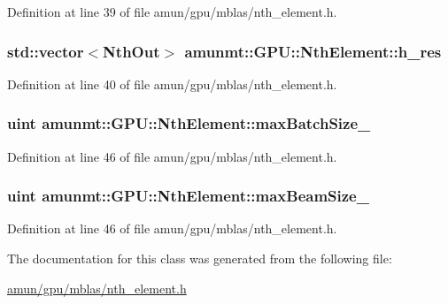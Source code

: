 Definition at line 39 of file amun/gpu/mblas/nth\+\_\+element.\+h.

\subsubsection[{\texorpdfstring{h\+\_\+res}{h_res}}]{\setlength{\rightskip}{0pt plus 5cm}std\+::vector$<${\bf Nth\+Out}$>$ amunmt\+::\+G\+P\+U\+::\+Nth\+Element\+::h\+\_\+res\hspace{0.3cm}{\ttfamily [private]}}\hypertarget{classamunmt_1_1GPU_1_1NthElement_ab23b653e994f5b6a24bcb12aa8afc1e7}{}\label{classamunmt_1_1GPU_1_1NthElement_ab23b653e994f5b6a24bcb12aa8afc1e7}


Definition at line 40 of file amun/gpu/mblas/nth\+\_\+element.\+h.

\subsubsection[{\texorpdfstring{max\+Batch\+Size\+\_\+}{maxBatchSize_}}]{\setlength{\rightskip}{0pt plus 5cm}uint amunmt\+::\+G\+P\+U\+::\+Nth\+Element\+::max\+Batch\+Size\+\_\+\hspace{0.3cm}{\ttfamily [private]}}\hypertarget{classamunmt_1_1GPU_1_1NthElement_a86641a85c4e1c28d3e4776640a10187f}{}\label{classamunmt_1_1GPU_1_1NthElement_a86641a85c4e1c28d3e4776640a10187f}


Definition at line 46 of file amun/gpu/mblas/nth\+\_\+element.\+h.

\subsubsection[{\texorpdfstring{max\+Beam\+Size\+\_\+}{maxBeamSize_}}]{\setlength{\rightskip}{0pt plus 5cm}uint amunmt\+::\+G\+P\+U\+::\+Nth\+Element\+::max\+Beam\+Size\+\_\+\hspace{0.3cm}{\ttfamily [private]}}\hypertarget{classamunmt_1_1GPU_1_1NthElement_a86e18f1731eb39119d07d2f1b6692dca}{}\label{classamunmt_1_1GPU_1_1NthElement_a86e18f1731eb39119d07d2f1b6692dca}


Definition at line 46 of file amun/gpu/mblas/nth\+\_\+element.\+h.



The documentation for this class was generated from the following file\+:\begin{DoxyCompactItemize}
\item 
\hyperlink{amun_2gpu_2mblas_2nth__element_8h}{amun/gpu/mblas/nth\+\_\+element.\+h}\end{DoxyCompactItemize}

